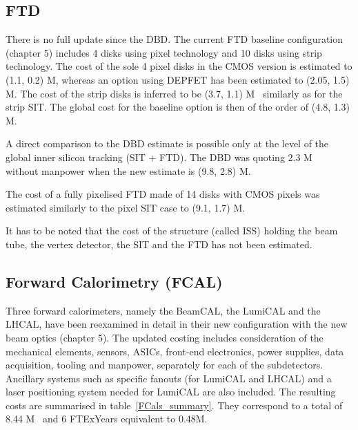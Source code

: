 \subsection{FTD}
There is no full update since the DBD. The current FTD baseline configuration (chapter 5) includes 4 disks using pixel technology and 10 disks using strip technology. The cost of the sole 4 pixel disks in the CMOS version is estimated to (1.1, 0.2) M\texteuro, whereas an option using DEPFET has been estimated to (2.05, 1.5) M\texteuro.
The cost of the strip disks is inferred to be (3.7, 1.1) M\texteuro~ similarly as for the strip SIT. The global cost for the baseline option is then of the order of (4.8, 1.3) M\texteuro. 

A direct comparison to the DBD estimate is possible only at the level of the global inner silicon tracking (SIT + FTD). The DBD was quoting 2.3 M\texteuro~ without manpower when the new estimate is (9.8, 2.8) M\texteuro.

The cost of a fully pixelised FTD made of 14 disks with CMOS pixels was estimated similarly to the pixel SIT case to (9.1, 1.7) M\texteuro.


It has to be noted that the cost of the structure (called ISS) holding the beam tube, the vertex detector, the SIT and the FTD has not been estimated.

\subsection{Forward Calorimetry (FCAL)}

Three forward calorimeters, namely the BeamCAL, the LumiCAL and the LHCAL, have been reexamined in detail in their new configuration with the new beam optics (chapter 5). The updated costing includes consideration of the mechanical elements, sensors, ASICs, front-end electronics, power supplies, data acquisition, tooling and manpower, separately for each of the subdetectors. Ancillary systems such as specific fanouts (for LumiCAL and LHCAL) and a laser positioning system needed for LumiCAL are also included. The resulting costs are summarised in table~\ref{FCals_summary}. They correspond to a total of 8.44 M\texteuro~ and 6 FTExYears equivalent to 0.48M\texteuro.

